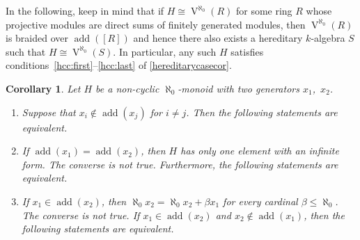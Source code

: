 \documentclass[a4paper,11pt,oneside]{amsart}
\newtheorem{cor}[teor]{Corollary}
\theoremstyle{remark}
\DeclareMathOperator{\add}{add}
\DeclareMathOperator{\Vmon}{V}
\begin{document}
In the following, keep in mind that if $H \cong \Vmon^{\aleph_0}(R)$ for some ring $R$ whose projective modules are direct sums of finitely generated modules, then $\Vmon^{\aleph_0}(R)$ is braided over $\add([R])$ and hence there also exists a hereditary $k$-algebra $S$ such that $H \cong \Vmon^{\aleph_0}(S)$.
In particular, any such $H$ satisfies conditions~\ref{hcc:first}--\ref{hcc:last} of \cref{hereditarycasecor}.


\begin{cor}\label{hereditarycase}
Let $H$ be a non-cyclic $\aleph_0$-monoid with two generators $x_1$,~$x_2$.
\begin{enumerate}
\item\label{hc:incomparable} Suppose that $x_i \not \in \add (x_j)$ for $i \neq j$. Then the following statements are equivalent.
\item\label{hc:equality} If $\add(x_1) = \add (x_2)$, then $H$ has only one element with an infinite form.
  The converse is not true.
  Furthermore, the following statements are equivalent.
\item\label{hc:inclusion} If $x_1\in \add(x_2)$, then $\aleph_0 x_2 = \aleph_0 x_2 + \beta x_1$ for every cardinal $\beta \le \aleph_0$. The converse is not true.
  If $x_1\in \add(x_2)$ and $x_2\notin \add(x_1)$, then the following statements are equivalent.
\end{enumerate}
\end{cor}
\end{document}
